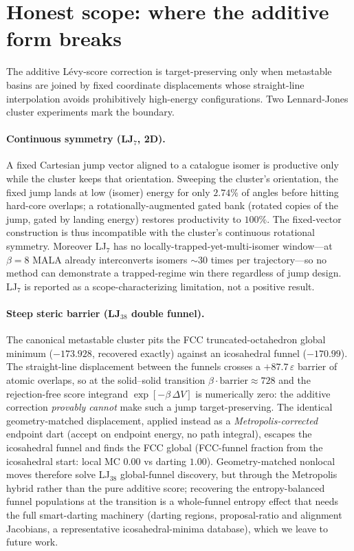 \section{Honest scope: where the additive form breaks}
\label{sec:move5}

The additive L\'evy-score correction is target-preserving only when metastable basins are joined by
fixed coordinate displacements whose straight-line interpolation avoids prohibitively high-energy
configurations. Two Lennard-Jones cluster experiments mark the boundary.

\paragraph{Continuous symmetry (LJ$_7$, 2D).} A fixed Cartesian jump vector aligned to a catalogue
isomer is productive only while the cluster keeps that orientation. Sweeping the cluster's
orientation, the fixed jump lands at low (isomer) energy for only $2.74\%$ of angles before hitting
hard-core overlaps; a rotationally-augmented gated bank (rotated copies of the jump, gated by landing
energy) restores productivity to $100\%$. The fixed-vector construction is thus incompatible with the
cluster's continuous rotational symmetry. Moreover LJ$_7$ has no locally-trapped-yet-multi-isomer
window---at $\beta=8$ MALA already interconverts isomers $\sim30$ times per trajectory---so no method
can demonstrate a trapped-regime win there regardless of jump design. LJ$_7$ is reported as a
scope-characterizing limitation, not a positive result.

\paragraph{Steep steric barrier (LJ$_{38}$ double funnel).} The canonical metastable cluster pits
the FCC truncated-octahedron global minimum ($-173.928$, recovered exactly) against an icosahedral
funnel ($-170.99$). The straight-line displacement between the funnels crosses a $+87.7\,\varepsilon$
barrier of atomic overlaps, so at the solid--solid transition $\beta\cdot\text{barrier}\approx728$
and the rejection-free score integrand $\exp[-\beta\,\Delta V]$ is numerically zero: the additive
correction \emph{provably cannot} make such a jump target-preserving. The identical geometry-matched
displacement, applied instead as a \emph{Metropolis-corrected} endpoint dart (accept on endpoint
energy, no path integral), escapes the icosahedral funnel and finds the FCC global (FCC-funnel
fraction from the icosahedral start: local MC $0.00$ vs darting $1.00$). Geometry-matched nonlocal
moves therefore solve LJ$_{38}$ global-funnel discovery, but through the Metropolis hybrid rather
than the pure additive score; recovering the entropy-balanced funnel populations at the transition is
a whole-funnel entropy effect that needs the full smart-darting machinery (darting regions,
proposal-ratio and alignment Jacobians, a representative icosahedral-minima database), which we leave
to future work.

